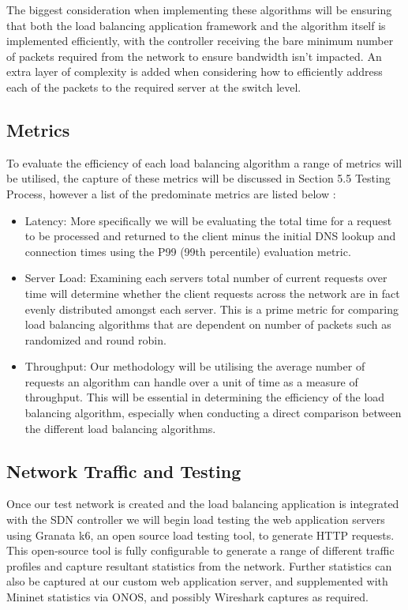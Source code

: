 The biggest consideration when implementing these algorithms will be ensuring that both the load balancing application framework and the algorithm itself is implemented efficiently, with the controller receiving the bare minimum number of packets required from the network to ensure bandwidth isn’t impacted. An extra layer of complexity is added when considering how to efficiently address each of the packets to the required server at the switch level.  

\subsection{Metrics}
To evaluate the  efficiency of each load balancing algorithm a range of metrics will be utilised, the capture of these metrics will be discussed in Section 5.5 Testing Process, however a list of the predominate metrics are listed below :
\begin{itemize}
    \item Latency: More specifically we will be evaluating the total time for a request to be processed and returned to the client minus the initial DNS lookup and connection times using the P99 (99th percentile) evaluation metric. 
    \item Server Load: Examining each servers total number of current requests over time will determine whether the client requests across the network are in fact evenly distributed amongst each server. This is a prime metric for comparing load balancing algorithms that are dependent on number of packets such as randomized and round robin.
    \item Throughput: Our methodology will be utilising the average number of requests an algorithm can handle over a unit of time as a measure of throughput. This will be essential in determining the efficiency of the load balancing algorithm, especially when conducting a direct comparison between the different load balancing algorithms.
\end{itemize}

\subsection{Network Traffic and Testing}
Once our test network is created and the load balancing application is integrated with the SDN controller we will begin load testing the web application servers using Granata k6, an open source load testing tool, to generate HTTP requests\cite{k6}. This open-source tool is fully configurable to generate a range of different traffic profiles and capture resultant statistics from the network\cite{k6}. Further statistics can also be captured at our custom web application server, and supplemented with Mininet statistics via ONOS, and possibly Wireshark captures as required.

